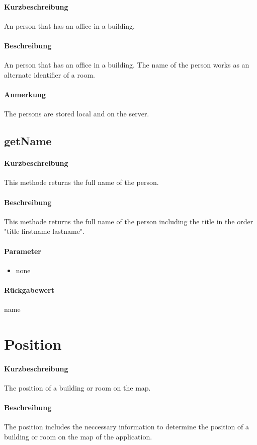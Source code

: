 \paragraph*{Kurzbeschreibung}
An person that has an office in a building.
\paragraph*{Beschreibung}
An person that has an office in a building. The name of the person works as an alternate identifier of a room.
\paragraph*{Anmerkung}
The persons are stored local and on the server.

\subsection{getName}%
\paragraph*{Kurzbeschreibung}
This methode returns the full name of the person.
\paragraph*{Beschreibung}
This methode returns the full name of the person including the title in the order "title firstname lastname".
\paragraph*{Parameter}
\begin{itemize}
    \item none
\end{itemize}
\paragraph*{Rückgabewert}
name


\section{Position}
\paragraph*{Kurzbeschreibung}
The position of a building or room on the map.
\paragraph*{Beschreibung}
The position includes the neccessary information to determine the position of a building or room on the map of the application.
